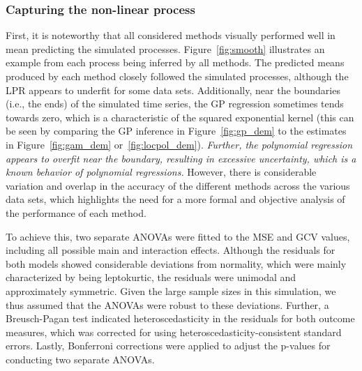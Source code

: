 \documentclass[man, floatsintext]{apa7}
\begin{document}
\subsubsection{Capturing the non-linear process}

First, it is noteworthy that all considered methods visually performed well in
mean predicting the simulated processes. Figure~\ref{fig:smooth} illustrates an
example from each process being inferred by all methods. The predicted means
produced by each method closely followed the simulated processes, although the
LPR appears to underfit for some data sets. Additionally, near the boundaries
(i.e., the ends) of the simulated time series, the GP regression sometimes
tends towards zero, which is a characteristic of the squared exponential kernel
(this can be seen by comparing the GP inference in Figure~\ref{fig:gp_dem} to
the estimates in Figure~\ref{fig:gam_dem} or~\ref{fig:locpol_dem}).
\textit{Further,
  the polynomial regression appears to overfit near the boundary, resulting in
  excessive uncertainty, which is a known behavior of polynomial regressions.}
However, there is considerable variation and overlap in the accuracy of the
different methods across the various data sets, which highlights the need for a
more formal and objective analysis of the performance of each method.

\begin{sidewaysfigure*}[htbp]
  \caption{Example processes inferred by each of the introduced methods}
  \label{fig:smooth}
\end{sidewaysfigure*}

To achieve this, two separate ANOVAs were fitted to the MSE and GCV values,
including all possible main and interaction effects. Although the residuals for
both models showed considerable deviations from normality, which were mainly
characterized by being leptokurtic, the residuals were unimodal and
approximately symmetric. Given the large sample sizes in this simulation, we
thus assumed that the ANOVAs were robust to these deviations. Further, a
Breusch-Pagan test indicated heteroscedasticity in the residuals for both
outcome measures, which was corrected for using heteroscedasticity-consistent
standard errors. Lastly, Bonferroni corrections were applied to adjust the
p-values for conducting two separate ANOVAs.
\end{document}
